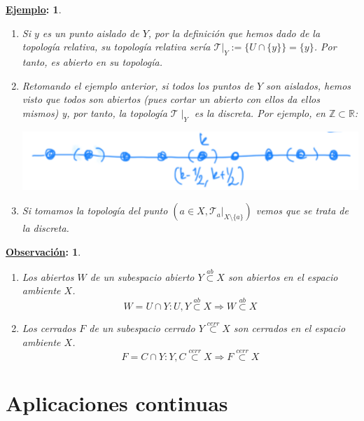 \documentclass[10pt,a4paper,openright]{book}
\theoremstyle{break}
\newtheorem*{obs}{\underline{Observación}:}
\newtheorem*{ej}{\underline{Ejemplo}:}
\begin{document}
\begin{ej}
\begin{enumerate}
    \item Si $y$ es un punto aislado de $Y$, por la definición que hemos dado de la topología relativa, su topología relativa sería $\mathcal{T}|_Y := \{ U \cap \{y\} \} = \{y\}$. Por tanto, es abierto en su topología.
    
    \item Retomando el ejemplo anterior, si todos los puntos de $Y$ son aislados, hemos visto que todos son abiertos (pues cortar un abierto con ellos da ellos mismos) y, por tanto, la topología $\mathcal{T}\mid_Y $ es la discreta. Por ejemplo, en $\mathbb{Z} \subset \mathbb{R}$:
    \begin{center}
        \includegraphics[scale=0.3]{images/def_subespacio_discreto} 
    \end{center}

    \item Si tomamos la topología del punto $(a \in X, \mathcal{T}_a|_{X \setminus \{a\}})$ vemos que se trata de la discreta.
\end{enumerate}
\end{ej}

\begin{obs}
\begin{enumerate}
    \item Los abiertos $W$ de un subespacio abierto $Y \stackrel{ab}{\subset} X$ son abiertos en el espacio ambiente $X$.
   	$$
    W = U \cap Y : U,Y\stackrel{ab}{\subset} X \Rightarrow W \stackrel{ab}{\subset} X 
    $$
    \item Los cerrados $F$ de un subespacio cerrado $Y \stackrel{cerr}{\subset} X$ son cerrados en el espacio ambiente $X$.
    $$
    F = C \cap Y : Y,C\stackrel{cerr}{\subset} X \Rightarrow F \stackrel{cerr}{\subset} X
    $$
\end{enumerate}
\end{obs}

\chapter{Aplicaciones continuas}%
\label{cha:aplicaciones_continuas}
\end{document}
